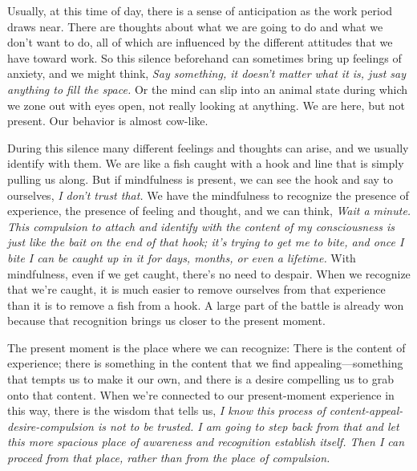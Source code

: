 Usually, at this time of day, there is a sense of anticipation as the 
work period draws near. There are thoughts about what we are going to 
do and what we don't want to do, all of which are influenced by the 
different attitudes that we have toward work. So this silence 
beforehand can sometimes bring up feelings of anxiety, and we might 
think, \emph{Say something, it doesn't matter what it is, just say 
anything to fill the space.} Or the mind can slip into an animal state 
during which we zone out with eyes open, not really looking at 
anything. We are here, but not present. Our behavior is almost cow-like.

During this silence many different feelings and thoughts can arise, and 
we usually identify with them. We are like a fish caught with a hook 
and line that is simply pulling us along. But if mindfulness is 
present, we can see the hook and say to ourselves, \emph{I don't trust 
that.} We have the mindfulness to recognize the presence of experience, 
the presence of feeling and thought, and we can think, \emph{Wait a 
minute. This compulsion to attach and identify with the content of my 
consciousness is just like the bait on the end of that hook; it's 
trying to get me to bite, and once I bite I can be caught up in it for 
days, months, or even a lifetime.} With mindfulness, even if we get 
caught, there's no need to despair. When we recognize that we're 
caught, it is much easier to remove ourselves from that experience than 
it is to remove a fish from a hook. A large part of the battle is 
already won because that recognition brings us closer to the present 
moment.

The present moment is the place where we can recognize: There is the 
content of experience; there is something in the content that we find 
appealing---something that tempts us to make it our own, and there is a 
desire compelling us to grab onto that content. When we're connected to 
our present-moment experience in this way, there is the wisdom that 
tells us, \emph{I know this process of content-appeal-desire-compulsion 
is not to be trusted. I am going to step back from that and let this 
more spacious place of awareness and recognition establish itself. Then 
I can proceed from that place, rather than from the place of 
compulsion.}

